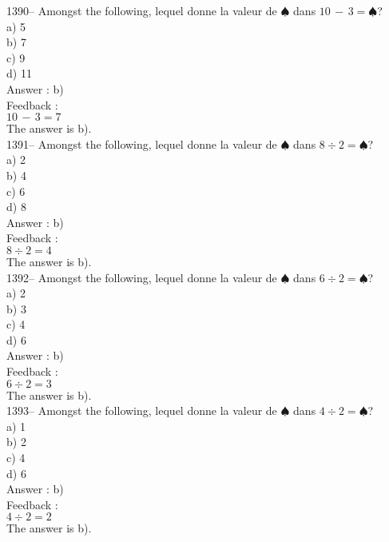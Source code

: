 ﻿\documentclass[letterpaper, 12pt]{article}
\begin{document}
1390-- Amongst the following, lequel donne la valeur de
$\spadesuit$ dans $10\,-\,3=\spadesuit$?\\
a) 5\\
b) 7\\
c) 9\\
d) 11\\

Answer : b)\\

Feedback : \\
$10\,-\,3=7$\\
The answer is b).\\

1391-- Amongst the following, lequel donne la valeur de
$\spadesuit$ dans $8\div2=\spadesuit$?\\
a) 2\\
b) 4\\
c) 6\\
d) 8\\

Answer : b)\\

Feedback : \\
$8\div2=4$\\
The answer is b).\\

1392-- Amongst the following, lequel donne la valeur de
$\spadesuit$ dans $6\div2=\spadesuit$?\\
a) 2\\
b) 3\\
c) 4\\
d) 6\\

Answer : b)\\

Feedback : \\
$6\div2=3$\\
The answer is b).\\

1393-- Amongst the following, lequel donne la valeur de
$\spadesuit$ dans $4\div2=\spadesuit$?\\
a) 1\\
b) 2\\
c) 4\\
d) 6\\

Answer : b)\\

Feedback : \\
$4\div2=2$\\
The answer is b).\\
\end{document}
